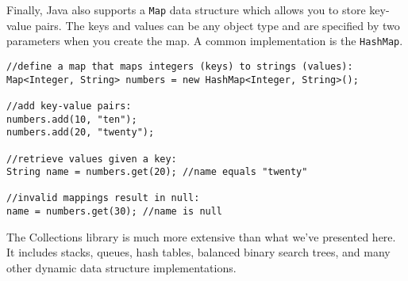 Finally, Java also supports a \texttt{Map} data structure
which allows you to store key-value pairs.  The keys and values
can be any object type and are specified by two parameters when
you create the map.  A common implementation is the \texttt{HashMap}.

\begin{verbatim}
//define a map that maps integers (keys) to strings (values):
Map<Integer, String> numbers = new HashMap<Integer, String>();

//add key-value pairs:
numbers.add(10, "ten");
numbers.add(20, "twenty");

//retrieve values given a key:
String name = numbers.get(20); //name equals "twenty"

//invalid mappings result in null:
name = numbers.get(30); //name is null
\end{verbatim}

The Collections library is much more extensive than what we've 
presented here.  It includes stacks, queues, hash tables, balanced 
binary search trees, and many other dynamic data structure 
implementations.
